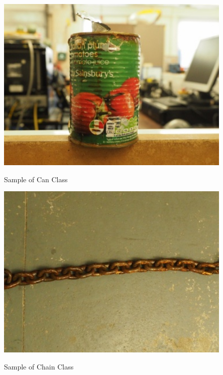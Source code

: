 \begin{marginfigure}
    \centering
    \includegraphics[width = 0.85\textwidth]{chapters/images/dataset/can.jpg}
    \caption{Sample of Can Class}
    \label{md:can}
\end{marginfigure}

\begin{marginfigure}
    \centering
    \includegraphics[width = 0.85\textwidth]{chapters/images/dataset/chain.jpg}
    \caption{Sample of Chain Class}
    \label{md:chain}
\end{marginfigure}

